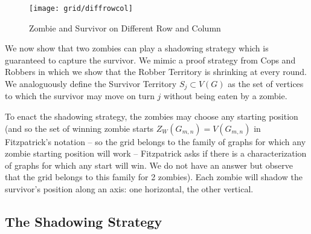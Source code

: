  \begin{figure}[h]
   \centering
   \texttt{[image: grid/diffrowcol]}
   \caption{Zombie and Survivor on Different Row and Column}
 \end{figure}

We now show that two zombies can play a shadowing strategy which is guaranteed to
capture the survivor. We mimic a proof strategy from Cops and Robbers in which we show
that the Robber Territory is shrinking at every round.
We analoguously define the Survivor Territory $S_j \subset V(G)$  as
the set of vertices to which the survivor may move on turn $j$ without being eaten
by a zombie.

To enact the shadowing strategy, the zombies may choose any starting position
(and so the set of winning zombie starts $Z_W(G_{m,n}) = V(G_{m,n})$ in Fitzpatrick's notation -- so the grid
belongs to the family of graphs for which any zombie starting position will work -- Fitzpatrick
asks if there is a characterization of graphs for which any start will win. We do not have an answer
but observe that the grid belongs to this family for 2 zombies).
Each zombie will shadow the survivor's position along an axis: one horizontal,
the other vertical.

\subsection{The Shadowing Strategy}

